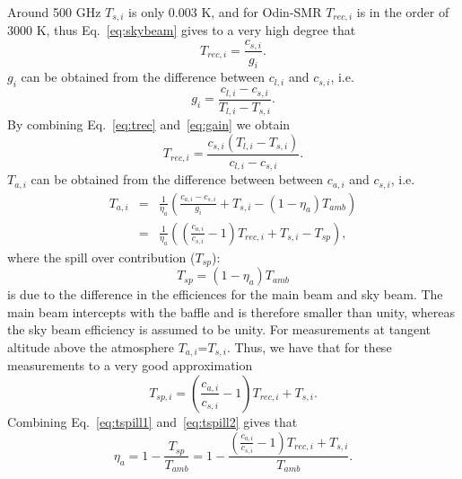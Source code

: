 \documentclass[12pt]{article}
\begin{document}
Around 500 GHz \(T_{s,i}\) is only 0.003 K, and for Odin-SMR
\(T_{rec,i}\) is in the order of 3000 K, thus Eq.~\ref{eq:skybeam} gives
to a very high degree that
\begin{equation}
\label{eq:trec}
T_{rec,i}=\frac{c_{s,i}}{g_{i}}.
\end{equation}
\(g_{i}\) can be obtained from the difference between \(c_{l,i}\) and
 \(c_{s,i}\), i.e.
\begin{equation}
\label{eq:gain}
g_{i}=\frac{c_{l,i}-c_{s,i}}{T_{l,i}-T_{s,i}}.
\end{equation}
By combining Eq.~\ref{eq:trec} and~\ref{eq:gain} we obtain
\begin{equation}
\label{eq:trec2}
T_{rec,i}=\frac{c_{s,i}({T_{l,i}-T_{s,i}})}{c_{l,i}-c_{s,i}}.
\end{equation}
\(T_{a,i}\) can be obtained from the difference between between
\(c_{a,i}\) and \(c_{s,i}\), i.e.
\begin{eqnarray}
\label{eq:ta}
T_{a,i} &=& \frac{1}{\eta_{a}}\left(\frac{c_{a,i}-c_{s,i}}{g_{i}}+T_{s,i}-(1-\eta_{a})T_{amb}\right) \nonumber\\
 &=& \frac{1}{\eta_{a}}\left( \left(\frac{c_{a,i}}{c_{s,i}}-1\right)T_{rec,i}+T_{s,i}-T_{sp}\right), 
\end{eqnarray}
where the spill over contribution (\(T_{sp}\)): 
\begin{equation}
\label{eq:tspill1}
T_{sp}=(1-\eta_{a})T_{amb}
\end{equation}
is due to the difference
in the efficiences for the main beam and sky beam.
The main beam intercepts with the baffle and is therefore
smaller than unity, whereas the sky beam efficiency is assumed to be unity. 
For measurements at tangent altitude above the atmosphere
\(T_{a,i}\)=\(T_{s,i}\). Thus, we have that for these measurements
to a very good approximation
\begin{equation}
\label{eq:tspill2}
T_{sp,i}= \left(\frac{c_{a,i}}{c_{s,i}}-1\right)T_{rec,i}+T_{s,i}.
\end{equation}
Combining Eq.~\ref{eq:tspill1} and~\ref{eq:tspill2} gives that
\begin{equation}
\label{eq:eta}
\eta_{a}=1-\frac{T_{sp}}{T_{amb}}=1-\frac{\left(\frac{c_{a,i}}{c_{s,i}}-1\right)T_{rec,i}+T_{s,i}}{T_{amb}}.
\end{equation}
\end{document}
